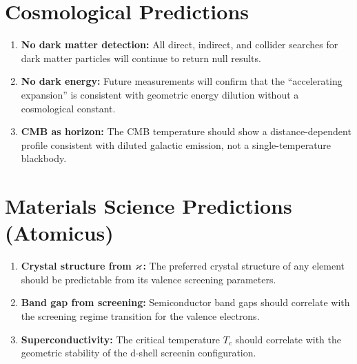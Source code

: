 \section{Cosmological Predictions}

\begin{enumerate}
  \item \textbf{No dark matter detection:} All direct, indirect, and collider searches for dark matter particles will continue to return null results.
  \item \textbf{No dark energy:} Future measurements will confirm that the ``accelerating expansion'' is consistent with geometric energy dilution without a cosmological constant.
  \item \textbf{CMB as horizon:} The CMB temperature should show a distance-dependent profile consistent with diluted galactic emission, not a single-temperature blackbody.
\end{enumerate}

\section{Materials Science Predictions (Atomicus)}

\begin{enumerate}
  \item \textbf{Crystal structure from $\varkappa$:} The preferred crystal structure of any element should be predictable from its valence screening parameters.
  \item \textbf{Band gap from screening:} Semiconductor band gaps should correlate with the screening regime transition for the valence electrons.
  \item \textbf{Superconductivity:} The critical temperature $T_c$ should correlate with the geometric stability of the d-shell screenin configuration.
\end{enumerate}
